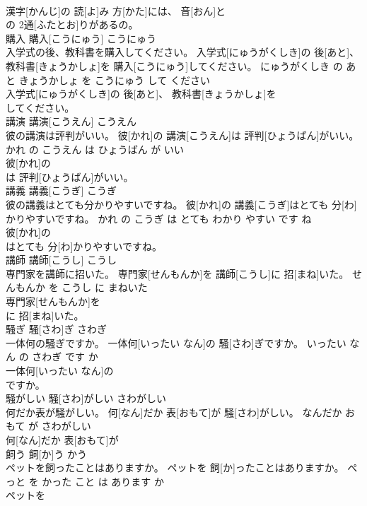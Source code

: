 \documentclass[8pt]{extreport}
\begin{document}
\begin{CJK}{UTF8}{min}
\\	漢字[かんじ]の 読[よ]み 方[かた]には、 音[おん]と
\\	の 2通[ふたとお]りがあるの。			
\\	購入	購入[こうにゅう]	こうにゅう	
\\	入学式の後、教科書を購入してください。	入学式[にゅうがくしき]の 後[あと]、 教科書[きょうかしょ]を 購入[こうにゅう]してください。	にゅうがくしき の あと きょうかしょ を こうにゅう して ください	
\\	入学式[にゅうがくしき]の 後[あと]、 教科書[きょうかしょ]を
\\	してください。			
\\	講演	講演[こうえん]	こうえん	
\\	彼の講演は評判がいい。	彼[かれ]の 講演[こうえん]は 評判[ひょうばん]がいい。	かれ の こうえん は ひょうばん が いい	
\\	彼[かれ]の
\\	は 評判[ひょうばん]がいい。			
\\	講義	講義[こうぎ]	こうぎ	
\\	彼の講義はとても分かりやすいですね。	彼[かれ]の 講義[こうぎ]はとても 分[わ]かりやすいですね。	かれ の こうぎ は とても わかり やすい です ね	
\\	彼[かれ]の
\\	はとても 分[わ]かりやすいですね。			
\\	講師	講師[こうし]	こうし	
\\	専門家を講師に招いた。	専門家[せんもんか]を 講師[こうし]に 招[まね]いた。	せんもんか を こうし に まねいた	
\\	専門家[せんもんか]を
\\	に 招[まね]いた。			
\\	騒ぎ	騒[さわ]ぎ	さわぎ	
\\	一体何の騒ぎですか。	一体何[いったい なん]の 騒[さわ]ぎですか。	いったい なん の さわぎ です か	
\\	一体何[いったい なん]の
\\	ですか。			
\\	騒がしい	騒[さわ]がしい	さわがしい	
\\	何だか表が騒がしい。	何[なん]だか 表[おもて]が 騒[さわ]がしい。	なんだか おもて が さわがしい	
\\	何[なん]だか 表[おもて]が
\\	飼う	飼[か]う	かう	
\\	ペットを飼ったことはありますか。	ペットを 飼[か]ったことはありますか。	ぺっと を かった こと は あります か	
\\	ペットを

\end{CJK}
\end{document}
